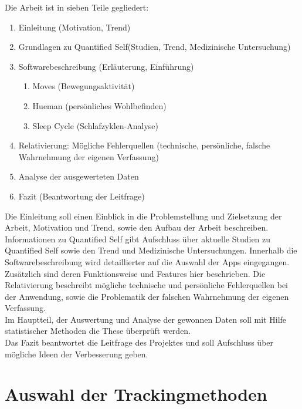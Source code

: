 Die Arbeit ist in sieben Teile gegliedert:

\begin{enumerate}
\def\labelenumi{\arabic{enumi}.}
\itemsep1pt\parskip0pt
\item
  Einleitung (Motivation, Trend)
\item
  Grundlagen zu Quantified Self(Studien, Trend, Medizinische
  Untersuchung)
\item
  Softwarebeschreibung (Erläuterung, Einführung)

  \begin{enumerate}
  \def\labelenumii{\alph{enumii}.}
  \itemsep1pt\parskip0pt
  \item
    Moves (Bewegungsaktivität)
  \item
    Hueman (persönliches Wohlbefinden)
  \item
    Sleep Cycle (Schlafzyklen-Analyse)
  \end{enumerate}
\item
  Relativierung: Mögliche Fehlerquellen (technische, persönliche,
  falsche Wahrnehmung der eigenen Verfassung)
\item
  Analyse der ausgewerteten Daten
\item
  Fazit (Beantwortung der Leitfrage)
\end{enumerate}

Die Einleitung soll einen Einblick in die Problemstellung und Zielsetzung der Arbeit, Motivation und Trend, sowie den Aufbau der Arbeit beschreiben.
Informationen zu Quantified Self gibt Aufschluss über aktuelle Studien zu Quantified Self sowie den Trend und Medizinische Untersuchungen.
Innerhalb die Softwarebeschreibung wird detaillierter auf die Auswahl der Apps eingegangen.\\
Zusätzlich sind deren Funktionsweise und Features hier beschrieben.
Die Relativierung beschreibt mögliche technische und persönliche Fehlerquellen bei der Anwendung, sowie die Problematik der falschen Wahrnehmung der eigenen Verfassung.
\\
Im Hauptteil, der Auswertung und Analyse der gewonnen Daten soll mit Hilfe statistischer Methoden die These überprüft werden.
\\
Das Fazit beantwortet die Leitfrage des Projektes und soll Aufschluss über mögliche Ideen der Verbesserung geben.

\section{Auswahl der Trackingmethoden}
\label{ch:Einleitung:sec:AuswahlDerTrackingmethoden}

